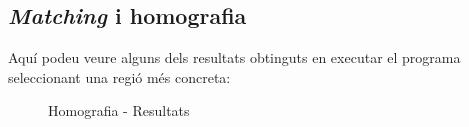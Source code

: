\newpage
	\subsection{\textit{Matching} i homografia}
		Aquí podeu veure alguns dels resultats obtinguts en executar el programa seleccionant una regió més concreta:\\
		\begin{figure}[!htb]
		\end{figure}

		\begin{figure}[!htb]
			\caption{Homografia - Resultats}
		\end{figure}
